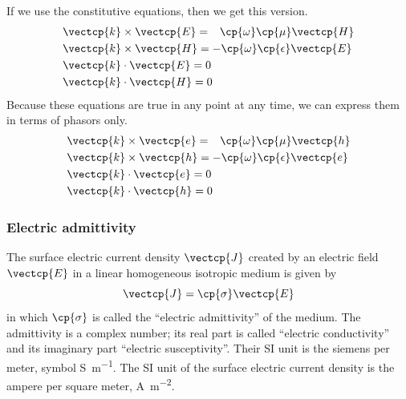 \begin{refsection}
If we use the constitutive equations, then we get this version.
\begin{subequations}
    \begin{align}
        &\vectcp{k} \times \vectcp{E} =
        \hphantom{\mathrel{-}}\cp{\omega} \cp{\mu} \vectcp{H} \\
        &\vectcp{k} \times \vectcp{H} =
        -\cp{\omega} \cp{\epsilon} \vectcp{E} \\
        &\vectcp{k} \cdot  \vectcp{E} = 0 \\
        &\vectcp{k} \cdot  \vectcp{H} = 0
    \end{align}
\end{subequations}
Because these equations are true in any point at any time, we can express them in terms of phasors only.
\begin{subequations}
    \begin{align}
        &\vectcp{k} \times \vectcp{e} =
        \hphantom{\mathrel{-}}\cp{\omega} \cp{\mu} \vectcp{h}
        \label{eq:maxwell_k_cross_e_phasor}
        \\
        &\vectcp{k} \times \vectcp{h} =
        -\cp{\omega} \cp{\epsilon} \vectcp{e}
        \label{eq:maxwell_k_cross_h_phasor}
        \\
        &\vectcp{k} \cdot  \vectcp{e} = 0
        \label{eq:maxwell_k_dot_e_phasor}
        \\
        &\vectcp{k} \cdot  \vectcp{h} = 0
        \label{eq:maxwell_k_dot_h_phasor}
    \end{align}
\end{subequations}

\subsubsection{Electric admittivity}
The surface electric current density $\vectcp{J}$ created by an electric field~$\vectcp{E}$ in a linear homogeneous isotropic medium is given by
\begin{equation}
    \vectcp{J} = \cp{\sigma} \vectcp{E}
\end{equation}
in which $\cp{\sigma}$ is called the ``electric admittivity'' of the medium.
The admittivity is a complex number;
its real part is called ``electric conductivity'' and its imaginary part ``electric susceptivity''.
Their SI unit is the siemens per meter, symbol \si{\siemens\per\meter}.
The SI unit of the surface electric current density is the ampere per square meter, \si{\ampere\per\meter\squared}.


\end{refsection}
